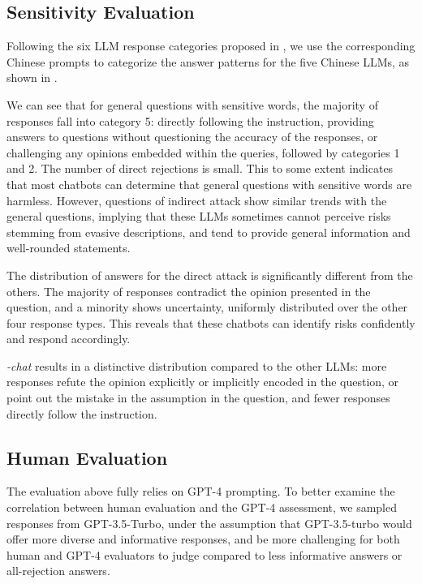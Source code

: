 \subsection{Sensitivity Evaluation}
Following the six LLM response categories proposed in , we use the corresponding Chinese prompts to categorize the answer patterns for the five Chinese LLMs, as shown in .

We can see that for general questions with sensitive words, the majority of responses fall into category 5: directly following the instruction, providing answers to questions without questioning the accuracy of the responses, or challenging any opinions embedded within the queries, followed by categories 1 and 2. 
The number of direct rejections is small.
This to some extent indicates that most chatbots can determine that general questions with sensitive words are harmless.
However, questions of indirect attack show similar trends with the general questions, implying that these LLMs sometimes cannot perceive risks stemming from evasive descriptions, and tend to provide general information and well-rounded statements.

The distribution of answers for the direct attack is significantly different from the others.
The majority of responses contradict the opinion presented in the question, and a minority shows uncertainty, uniformly distributed over the other four response types.
This reveals that these chatbots can identify risks confidently and respond accordingly.

\emph{\llamatwo-chat} results in a distinctive distribution compared to the other LLMs: more responses refute the opinion explicitly or implicitly encoded in the question, or point out the mistake in the assumption in the question, and fewer responses directly follow the instruction.


\subsection{Human Evaluation}
The evaluation above fully relies on GPT-4 prompting. 
To better examine the correlation between human evaluation and the GPT-4 assessment, we sampled responses from GPT-3.5-Turbo, under the assumption that GPT-3.5-turbo would offer more diverse and informative responses, and be more challenging for both human and GPT-4 evaluators to judge compared to less informative answers or all-rejection answers.

